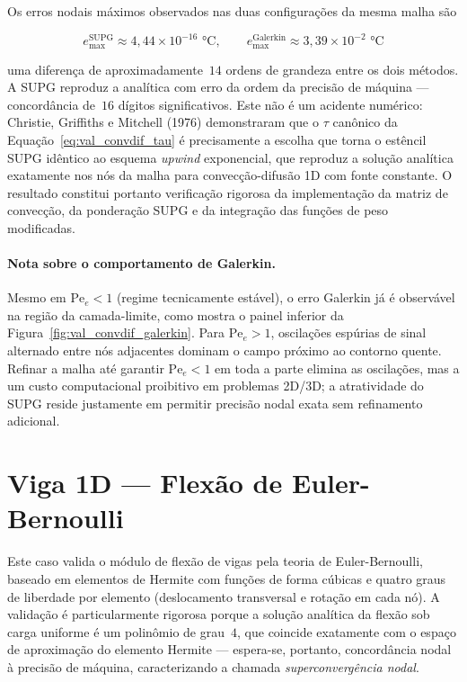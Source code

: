 Os erros nodais máximos observados nas duas configurações da mesma malha são

\begin{equation}
    e_{\max}^{\mathrm{SUPG}} \approx 4{,}44 \times 10^{-16} \text{~°C}, \qquad e_{\max}^{\mathrm{Galerkin}} \approx 3{,}39 \times 10^{-2} \text{~°C}
    \label{eq:val_convdif_erros}
\end{equation}

\noindent uma diferença de aproximadamente~$14$ ordens de grandeza entre os dois métodos. A SUPG reproduz a analítica com erro da ordem da precisão de máquina --- concordância de~$16$ dígitos significativos. Este não é um acidente numérico: Christie, Griffiths e Mitchell (1976) demonstraram que o $\tau$ canônico da Equação~\eqref{eq:val_convdif_tau} é precisamente a escolha que torna o estêncil SUPG idêntico ao esquema \emph{upwind} exponencial, que reproduz a solução analítica exatamente nos nós da malha para convecção-difusão 1D com fonte constante. O resultado constitui portanto verificação rigorosa da implementação da matriz de convecção, da ponderação SUPG e da integração das funções de peso modificadas.

\paragraph{Nota sobre o comportamento de Galerkin.} Mesmo em $\mathrm{Pe}_e < 1$ (regime tecnicamente estável), o erro Galerkin já é observável na região da camada-limite, como mostra o painel inferior da Figura~\ref{fig:val_convdif_galerkin}. Para $\mathrm{Pe}_e > 1$, oscilações espúrias de sinal alternado entre nós adjacentes dominam o campo próximo ao contorno quente. Refinar a malha até garantir $\mathrm{Pe}_e < 1$ em toda a parte elimina as oscilações, mas a um custo computacional proibitivo em problemas 2D/3D; a atratividade do SUPG reside justamente em permitir precisão nodal exata sem refinamento adicional.


\section{Viga 1D --- Flexão de Euler-Bernoulli}
\label{sec:val_viga}

Este caso valida o módulo de flexão de vigas pela teoria de Euler-Bernoulli, baseado em elementos de Hermite com funções de forma cúbicas e quatro graus de liberdade por elemento (deslocamento transversal e rotação em cada nó). A validação é particularmente rigorosa porque a solução analítica da flexão sob carga uniforme é um polinômio de grau~$4$, que coincide exatamente com o espaço de aproximação do elemento Hermite --- espera-se, portanto, concordância nodal à precisão de máquina, caracterizando a chamada \emph{superconvergência nodal}.

